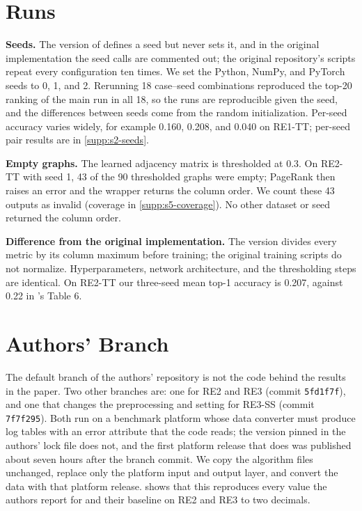 \documentclass[10pt]{article}
\begin{document}
\section{\causalrca Runs}
\label{sec:causalrca}

\textbf{Seeds.}
The \rcaeval version of \causalrca defines a seed but never sets it, and in the original implementation the seed calls are commented out; the original repository's scripts repeat every configuration ten times.
We set the Python, NumPy, and PyTorch seeds to 0, 1, and 2.
Rerunning 18 case--seed combinations reproduced the top-20 ranking of the main run in all 18, so the runs are reproducible given the seed, and the differences between seeds come from the random initialization.
Per-seed accuracy varies widely, for example 0.160, 0.208, and 0.040 on RE1-TT; per-seed pair results are in \cref{supp:s2-seeds}.

\textbf{Empty graphs.}
The learned adjacency matrix is thresholded at 0.3.
On RE2-TT with seed 1, 43 of the 90 thresholded graphs were empty; PageRank then raises an error and the wrapper returns the column order.
We count these 43 outputs as invalid (coverage in \cref{supp:s5-coverage}).
No other dataset or seed returned the column order.

\textbf{Difference from the original implementation.}
The \rcaeval version divides every metric by its column maximum before training; the original training scripts do not normalize.
Hyperparameters, network architecture, and the thresholding steps are identical.
On RE2-TT our three-seed mean top-1 accuracy is 0.207, against 0.22 in \rcaeval's Table 6.

\section{Authors' \simplerca Branch}
\label{sec:simplerca}

The default branch of the authors' repository is not the code behind the \rcaeval results in the \simplerca paper.
Two other branches are: one for RE2 and RE3 (commit \texttt{5fd1f7f}), and one that changes the preprocessing and \baro setting for RE3-SS (commit \texttt{7f7f295}).
Both run on a benchmark platform whose data converter must produce log tables with an error attribute that the code reads; the version pinned in the authors' lock file does not, and the first platform release that does was published about seven hours after the branch commit.
We copy the algorithm files unchanged, replace only the platform input and output layer, and convert the data with that platform release.
 shows that this reproduces every value the authors report for \simplerca and their \baro baseline on RE2 and RE3 to two decimals.
\end{document}
